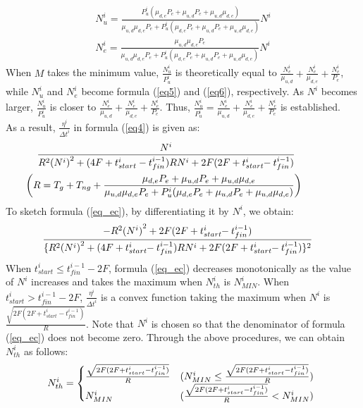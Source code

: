 \documentclass[journal]{IEEEtran}
\begin{document}
%
\begin{align}
N_u^i=\frac{P_u^i(\mu_{d,e}P_e+\mu_{u,d}P_e+\mu_{u,d}\mu_{d,e})}{\mu_{u,d}\mu_{d,e}P_e+P_u^i(\mu_{d,e}P_e+\mu_{u,d}P_e+\mu_{u,d}\mu_{d,e})}N^i\label{eq5}\\
N_e^i=\frac{\mu_{u,d}\mu_{d,e}P_e}{\mu_{u,d}\mu_{d,e}P_e+P_u^i(\mu_{d,e}P_e+\mu_{u,d}P_e+\mu_{u,d}\mu_{d,e})}N^i\label{eq6}
\end{align}
%
When $M$ takes the minimum value, $\frac{N_u^i}{P_u^i}$ is theoretically equal to $\frac{N_e^i}{\mu_{u,d}}+\frac{N_e^i}{\mu_{d,e}}+\frac{N_e^i}{P_e}$, while $N_u^i$ and $N_e^i$ become formula (\ref{eq5}) and (\ref{eq6}), respectively.
%
As $N^i$ becomes larger, $\frac{N_u^i}{P_u^i}$ is closer to $\frac{N_e^i}{\mu_{u,d}}+\frac{N_e^i}{\mu_{d,e}}+\frac{N_e^i}{P_e}$.
%
Thus, $\frac{N_u^i}{P_u^i}=\frac{N_e^i}{\mu_{u,d}}+\frac{N_e^i}{\mu_{d,e}}+\frac{N_e^i}{P_e}$ is established.\\
%
As a result, $\frac{\eta^{i}}{{\Delta{t}}^i}$ in formula (\ref{eq4}) is given as:
%
\begin{align}
&\hspace{-0.2cm}\frac{N^i}{R^2{(N^i)}^2+(4F+t_{start}^i-t_{fin}^{i-1})R{N^i}+2F(2F+t_{start}^i\hspace{-1mm}-t_{fin}^{i-1})}\hspace{1cm}\label{eq_ec}\\
&\hspace{-0.6cm}\biggl(R=T_g+T_{ng}+\frac{\mu_{d,e}P_e+\mu_{u,d}P_e+\mu_{u,d}\mu_{d,e}}{\mu_{u,d}\mu_{d,e}P_e+P_u^i(\mu_{d,e}P_e+\mu_{u,d}P_e+\mu_{u,d}\mu_{d,e})}\biggr)\nonumber
\end{align}
%
To sketch formula (\ref{eq_ec}), by differentiating it by $N^i$, we obtain:
%
\begin{align}
\hspace{-4mm} \frac{-{R^2{(N^i)}^2}+2F(2F+t_{start}^i\hspace{-1mm}-t_{fin}^{i-1})}{\{R^2{(N^i)}^2+(4F+t_{start}^i\hspace{-1mm}-t_{fin}^{i-1})R{N^i}+2F(2F+t_{start}^i\hspace{-1mm}-t_{fin}^{i-1})\}^2}
\end{align}
%
When $t_{start}^i \leq{t_{fin}^{i-1}-2F}$, formula (\ref{eq_ec}) decreases monotonically as the value of $N^i$ increases and takes the maximum when $N_{th}^i$ is $N_{MIN}^i$.
%
When $t_{start}^i >{t_{fin}^{i-1}-2F}$, $\frac{\eta^{i}}{{\Delta{t}}^i}$ is a convex function taking the maximum when $N^i$ is $\frac{\sqrt{2F(2F+t_{start}^i-t_{fin}^{i-1})}}{R}$.
%
Note that $N^i$ is chosen so that the denominator of formula (\ref{eq_ec}) does not become zero.
%
Through the above procedures, we can obtain $N_{th}^i$ as follows:
%
\begin{align}
 \hspace{-1.5mm} N_{th}^i= \begin{cases}
    \frac{\sqrt{2F(2F+t_{start}^i-t_{fin}^{i-1})}}{R} & ({N_{MIN}^i}\leq{\frac{\sqrt{2F(2F+t_{start}^i-t_{fin}^{i-1})}}{R}}) \\
    N_{MIN}^i& (\frac{\sqrt{2F(2F+t_{start}^i-t_{fin}^{i-1})}}{R}<{N_{MIN}^i})
  \end{cases}
\end{align}
\end{document}
